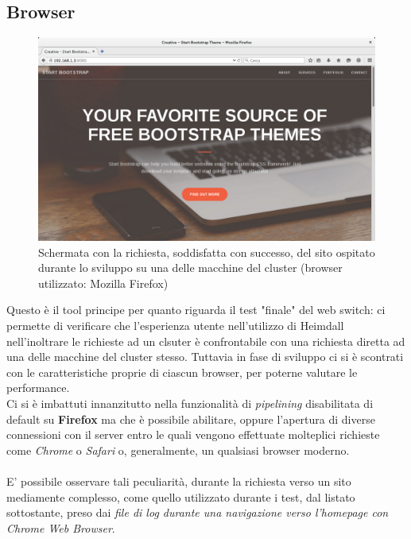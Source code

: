 \documentclass[italian]{tktltiki2}
\begin{document}
\subsection{Browser}
\begin{figure}[h]
\centering
\includegraphics[width=\textwidth]{images/screen_browser}
\caption{Schermata con la richiesta, soddisfatta con successo, del sito ospitato durante lo sviluppo su una delle macchine del cluster (browser utilizzato: Mozilla Firefox)}
\end{figure}
Questo è il tool principe per quanto riguarda il test "finale" del web switch: ci permette di verificare che l'esperienza utente nell'utilizzo di Heimdall nell'inoltrare le richieste ad un clsuter è confrontabile con una richiesta diretta ad una delle macchine del cluster stesso. Tuttavia in fase di sviluppo ci si è scontrati con le caratteristiche proprie di ciascun browser, per poterne valutare le performance. \\
Ci si è imbattuti innanzitutto nella funzionalità di \emph{pipelining} disabilitata di default su \textbf{Firefox} ma che è possibile abilitare, oppure l'apertura di diverse connessioni con il server entro le quali vengono effettuate molteplici richieste come \emph{Chrome} o \emph{Safari} o, generalmente, un qualsiasi browser moderno. \\\\
E' possibile osservare tali peculiarità, durante la richiesta verso un sito mediamente complesso, come quello utilizzato durante i test, dal listato sottostante, preso dai \emph{file di log durante una navigazione verso l'homepage con Chrome Web Browser}.
\end{document}
